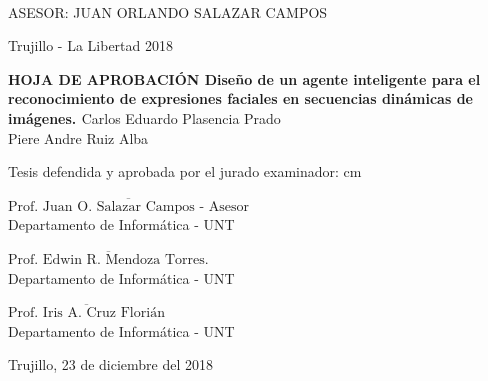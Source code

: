 \begin{center}
   {\bf {\fontsize{14}{16.8}\selectfont{CARLOS EDUARDO PLASENCIA PRADO}}}\\    
      {\bf {\fontsize{14}{16.8}\selectfont{PIERE ANDRE RUIZ ALBA}}}       
   \end{center}   

\vskip 2.5cm
\begin{center}
   {\bf \doublespacing {\fontsize{17}{20.4}\selectfont{DISEÑO DE UN AGENTE INTELIGENTE PARA EL RECONOCIMIENTO DE EXPRESIONES FACIALES EN SECUENCIAS DINÁMICAS DE IMÁGENES }}}     
\end{center}   
  \vskip 2cm
\begin{verse}
 \fontsize{12}{14.4}
\end{verse}

\vskip 1.5cm 
{\fontsize{14}{16.8}\selectfont ASESOR: JUAN ORLANDO SALAZAR CAMPOS} 
 \vskip 1cm 
 \begin{center}    
 \vskip 2cm
{\fontsize{14}{16.8}\selectfont Trujillo - La Libertad
\vskip 0.2cm
\hspace*{-0.2cm} 
2018}
\end{center} 
\newpage


\begin{center}
 {\bf {\Large HOJA DE APROBACIÓN }     
 \vskip 1cm
  {\Large Diseño de un agente inteligente para el reconocimiento de expresiones faciales en secuencias dinámicas de imágenes. }}
 \vskip 1cm 
  {\large{Carlos Eduardo Plasencia Prado}}\\
    {\large{Piere Andre Ruiz Alba}}

 \vskip 1cm
\end{center} 
Tesis defendida y aprobada por el jurado examinador:
 cm
\begin{flushleft} 
$\overline{\mbox{Prof. Juan O. Salazar Campos - Asesor}}$\\
\vskip -0.5cm
Departamento de Informática - UNT
\end{flushleft} 
\vskip 1cm
\begin{flushleft} 
$\overline{\mbox{Prof. Edwin R. Mendoza Torres.}}$\\
\vskip -0.5cm
Departamento de Informática - UNT
\end{flushleft} 
\vskip 1cm
\begin{flushleft} 
$\overline{\mbox{Prof. Iris A. Cruz Florián}}$\\
\vskip -0.5cm
Departamento de Informática - UNT
\end{flushleft}
\vskip 0.8cm 
\begin{center}    
Trujillo, 23 de diciembre del 2018
\end{center} 
\newpage


